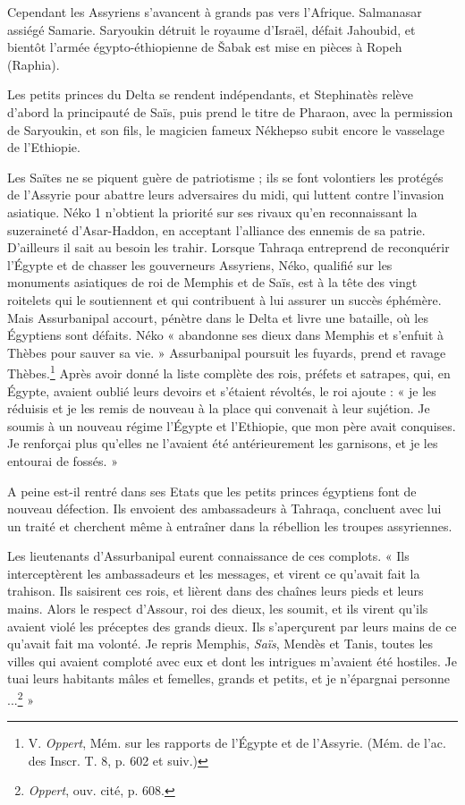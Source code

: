 \documentclass[a4paper, 11pt, oneside]{article}
\begin{document}
Cependant les Assyriens s'avancent à grands pas vers l'Afrique. Salmanasar assiégé Samarie. Saryoukin détruit le royaume d'Israël, défait Jahoubid, et bientôt l'armée égypto-éthiopienne de Šabak est mise en pièces à Ropeh (Raphia).

Les petits princes du Delta se rendent indépendants, et Stephinatès relève d'abord la principauté de Saïs, puis prend le titre de Pharaon, avec la permission de Saryoukin, et son fils, le magicien fameux Nékhepso subit encore le vasselage de l'Ethiopie.

Les Saïtes ne se piquent guère de patriotisme ; ils se font volontiers les protégés de l'Assyrie pour abattre leurs adversaires du midi, qui luttent contre l'invasion asiatique. Néko 1 n'obtient la priorité sur ses rivaux qu'en reconnaissant la suzeraineté d'Asar-Haddon, en acceptant l'alliance des ennemis de sa patrie. D'ailleurs il sait au besoin les trahir. Lorsque Tahraqa entreprend de reconquérir l'Égypte et de chasser les gouverneurs Assyriens, Néko, qualifié sur les monuments asiatiques de roi de Memphis et de Saïs, est à la tête des vingt roitelets qui le soutiennent et qui contribuent à lui assurer un succès éphémère. Mais Assurbanipal accourt, pénètre dans le Delta et livre une bataille, où les Égyptiens sont défaits. Néko « abandonne ses dieux dans Memphis et s'enfuit à Thèbes pour sauver sa vie. » Assurbanipal poursuit les fuyards, prend et ravage Thèbes.\footnote{V. \emph{Oppert}, Mém. sur les rapports de l'Égypte et de l'Assyrie. (Mém. de l'ac. des Inscr. T. 8, p. 602 et suiv.)} Après avoir donné la liste complète des rois, préfets et satrapes, qui, en Égypte, avaient oublié leurs devoirs et s'étaient révoltés, le roi ajoute : « je les réduisis et je les remis de nouveau à la place qui convenait à leur sujétion. Je soumis à un nouveau régime l'Égypte et l'Ethiopie, que mon père avait conquises. Je renforçai plus qu'elles ne l'avaient été antérieurement les garnisons, et je les entourai de fossés. »

A peine est-il rentré dans ses Etats que les petits princes égyptiens font de nouveau défection. Ils envoient des ambassadeurs à Tahraqa, concluent avec lui un traité et cherchent même à entraîner dans la rébellion les troupes assyriennes.

Les lieutenants d'Assurbanipal eurent connaissance de ces complots. « Ils interceptèrent les ambassadeurs et les messages, et virent ce qu'avait fait la trahison. Ils saisirent ces rois, et lièrent dans des chaînes leurs pieds et leurs mains. Alors le respect d'Assour, roi des dieux, les soumit, et ils virent qu'ils avaient violé les préceptes des grands dieux. Ils s'aperçurent par leurs mains de ce qu'avait fait ma volonté. Je repris Memphis, \emph{Saïs}, Mendès et Tanis, toutes les villes qui avaient comploté avec eux et dont les intrigues m'avaient été hostiles. Je tuai leurs habitants mâles et femelles, grands et petits, et je n'épargnai personne ...\footnote{\emph{Oppert}, ouv. cité, p. 608.} »
\end{document}

